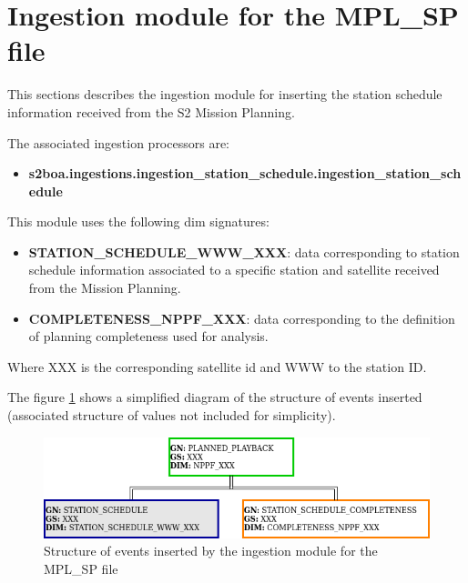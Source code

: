 \section{Ingestion module for the MPL\_SP file}

This sections describes the ingestion module for inserting the station schedule information received from the S2 Mission Planning.

The associated ingestion processors are:

\begin{itemize} 

\item \textbf{s2boa.ingestions.ingestion\_station\_schedule.ingestion\_station\_schedule}
  
\end{itemize}

This module uses the following \acrshort{dim} signatures:

\begin{itemize} 

\item \textbf{STATION\_SCHEDULE\_WWW\_XXX}: data corresponding to station schedule information associated to a specific station and satellite received from the Mission Planning.

\item \textbf{COMPLETENESS\_NPPF\_XXX}: data corresponding to the definition of planning completeness used for analysis.
  
\end{itemize}

Where XXX is the corresponding satellite id and WWW to the station ID.

The figure \ref{fg:structure_ingestion_station_schedule} shows a simplified diagram of the structure of events inserted (associated structure of values not included for simplicity).

\begin{figure}[H]
  \begin{center}
	\centering\includegraphics[width=150mm]{../fig/structure_ingestion_station_schedule.png}
	\caption{Structure of events inserted by the ingestion module for the MPL\_SP file}
	\label{fg:structure_ingestion_station_schedule}
  \end{center}
\end{figure}

